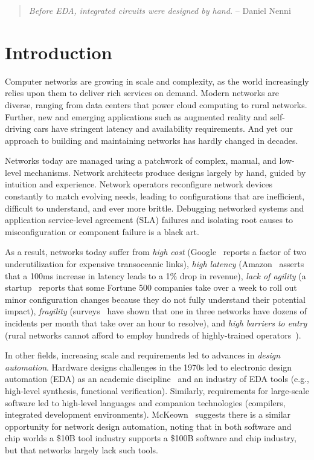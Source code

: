 \begin{quote}
{\em Before EDA, integrated circuits were designed by hand.} -- Daniel Nenni~\cite{wikicite}
\vspace{-2mm}
\end{quote}

\section{Introduction}

Computer networks are growing in scale and complexity, as the world increasingly relies upon them to deliver rich services on demand.  Modern networks are diverse, ranging from data centers that power cloud computing to rural networks.  Further, new and emerging applications such as augmented reality and self-driving cars have stringent latency and availability requirements. 
And yet our approach to building and maintaining networks has hardly changed in decades.

Networks today are managed using a patchwork of complex, manual, and low-level mechanisms. Network architects produce designs largely by hand, guided by intuition and experience. Network operators reconfigure network devices constantly to match evolving needs, leading to configurations that are inefficient, difficult to understand, and ever more brittle.  Debugging
networked systems and application service-level agreement (SLA) failures and isolating root causes to
misconfiguration or component failure is a black art.

As a result, networks today suffer from {\em high cost} (Google~\cite{b4} reports a factor of two underutilization for expensive transoceanic links), {\em high latency} (Amazon~\cite{amazon} asserts that a 100ms increase in latency leads to a 1\% drop in revenue), {\em lack of agility} (a startup~\cite{mahajan} reports that some Fortune 500 companies take over a week to roll out minor configuration changes because they do not fully understand their potential impact), {\em fragility} (surveys~\cite{atpg} have shown that one in three networks have dozens of incidents per month that take over an hour to resolve), and {\em high barriers to entry} (rural networks cannot afford to employ hundreds of highly-trained operators~\cite{barathwisp}). 

In other fields, increasing scale and requirements led to advances in \emph{design automation}. Hardware designs challenges in the 1970s led to electronic design automation (EDA) as an academic discipline~\cite{alberto} and an industry of EDA tools (e.g., high-level synthesis, functional verification). Similarly, requirements for large-scale software led to high-level languages and companion technologies (compilers, integrated development environments).   McKeown~\cite{mckeown} suggests there is a similar opportunity for network design automation, noting that in both software and chip worlds a \$10B tool industry supports a \$100B software and chip industry, but that networks largely lack such tools.

